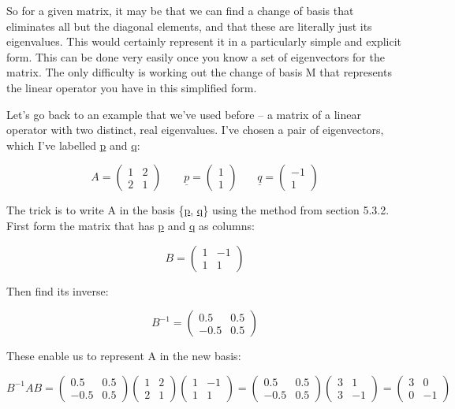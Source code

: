 \documentclass[oneside,english]{amsbook}
\numberwithin{section}{chapter}
\theoremstyle{plain}
\theoremstyle{definition}
\begin{document}
So for a given matrix, it may be that we can find a change of basis that
eliminates all but the diagonal elements, and that these are literally
just its eigenvalues. This would certainly represent it in a
particularly simple and explicit form. This can be done very easily once
you know a set of eigenvectors for the matrix. The only difficulty is
working out the change of basis M that represents the linear operator
you have in this simplified form.

Let's go back to an example that we've used before -- a matrix of a
linear operator with two distinct, real eigenvalues. I've chosen a pair
of eigenvectors, which I've labelled \ul{p} and \ul{q}:

\[A = \begin{pmatrix}
	1 & 2 \\
	2 & 1
\end{pmatrix}\ \ \ \ \ \ \ \ \ \underline{p} = \begin{pmatrix}
	1 \\
	1
\end{pmatrix}\ \ \ \ \ \ \ \ \underline{q} = \begin{pmatrix}
	- 1 \\
	1
\end{pmatrix}\]

The trick is to write A in the basis \{\ul{p}, \ul{q}\} using the method
from section 5.3.2. First form the matrix that has \ul{p} and \ul{q} as
columns:

\[B = \begin{pmatrix}
	1 & - 1 \\
	1 & 1
\end{pmatrix}\]

Then find its inverse:

\[B^{- 1} = \begin{pmatrix}
	0.5 & 0.5 \\
	- 0.5 & 0.5
\end{pmatrix}\]

These enable us to represent A in the new basis:

\[B^{- 1}AB = \begin{pmatrix}
	0.5 & 0.5 \\
	- 0.5 & 0.5
\end{pmatrix}\begin{pmatrix}
	1 & 2 \\
	2 & 1
\end{pmatrix}\begin{pmatrix}
	1 & - 1 \\
	1 & 1
\end{pmatrix} = \begin{pmatrix}
	0.5 & 0.5 \\
	- 0.5 & 0.5
\end{pmatrix}\begin{pmatrix}
	3 & 1 \\
	3 & - 1
\end{pmatrix} = \begin{pmatrix}
	3 & 0 \\
	0 & - 1
\end{pmatrix}\]
\end{document}
